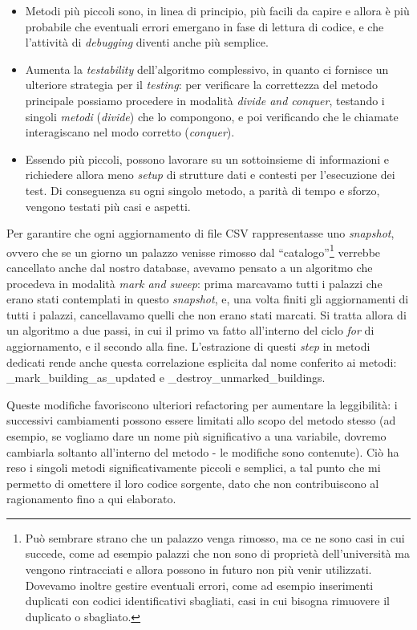 \documentclass[12pt]{report}
\begin{document}
\begin{itemize}
  \item Metodi più piccoli sono, in linea di principio, più facili 
  da capire e allora è più probabile 
  che eventuali errori emergano in fase di lettura di codice,
  e che l'attività di \textit{debugging} diventi anche più semplice.
  \item Aumenta la \textit{testability} dell'algoritmo complessivo, in quanto
  ci fornisce un ulteriore strategia per il \textit{testing}: 
  per verificare la correttezza del metodo principale 
  possiamo procedere in modalità \textit{divide and conquer}, 
  testando i singoli \textit{metodi} (\textit{divide}) 
  che lo compongono, e poi verificando che le
  chiamate interagiscano nel modo corretto (\textit{conquer}).
  \item Essendo più piccoli, possono lavorare su un sottoinsieme 
  di informazioni e richiedere allora meno \textit{setup} 
  di strutture dati e contesti per l'esecuzione dei test. Di conseguenza
  su ogni singolo metodo, a parità di tempo e sforzo, vengono testati
  più casi e aspetti.
\end{itemize}

Per garantire che ogni aggiornamento di
file CSV rappresentasse uno \textit{snapshot}, ovvero che se un giorno un
palazzo venisse rimosso dal ``catalogo''\footnote{
Può sembrare strano che un palazzo venga rimosso, ma ce ne sono casi in cui
succede, come ad esempio palazzi che non sono di proprietà dell'università
ma vengono rintracciati e allora possono in futuro non più venir utilizzati. 
Dovevamo inoltre gestire eventuali errori, come ad esempio inserimenti duplicati
con codici identificativi sbagliati, casi in cui bisogna rimuovere il duplicato
o sbagliato.
}
verrebbe cancellato anche dal nostro database, avevamo pensato a un algoritmo
che procedeva in modalità \textit{mark and sweep}: prima marcavamo tutti i palazzi
che erano stati contemplati in questo \textit{snapshot}, e, una volta
finiti gli aggiornamenti di tutti i palazzi, cancellavamo quelli
che non erano stati marcati. Si tratta allora di un algoritmo a due passi,
in cui il primo va fatto all'interno del ciclo \textit{for} di
aggiornamento, e il 
secondo alla fine. L'estrazione di questi \textit{step} in metodi dedicati
rende anche questa correlazione esplicita dal nome conferito ai metodi:
\_mark\_building\_as\_updated e \_destroy\_unmarked\_buildings.

Queste modifiche favoriscono ulteriori refactoring per 
aumentare la leggibilità: i successivi cambiamenti possono 
essere limitati allo scopo del metodo stesso (ad esempio, 
se vogliamo dare un nome più significativo a una variabile, 
dovremo cambiarla soltanto all'interno del metodo - le modifiche sono
contenute). Ciò ha reso i singoli metodi significativamente piccoli e
semplici, a tal punto che mi permetto di omettere il loro codice sorgente,
dato che non contribuiscono al ragionamento fino a qui elaborato.
\end{document}
